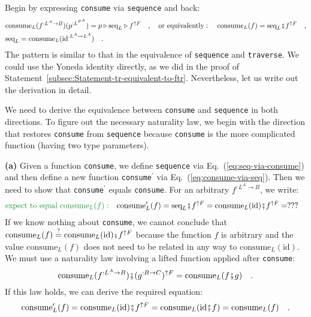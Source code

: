 Begin by expressing \lstinline!consume! via \lstinline!sequence!
and back:
\begin{align}
 & \text{consume}_{L}(f^{:L^{A}\rightarrow B})(p^{:L^{F^{A}}})=p\triangleright\text{seq}_{L}\triangleright f^{\uparrow F}\quad,\quad\text{or equivalently}:\quad\text{consume}_{L}(f)=\text{seq}_{L}\bef f^{\uparrow F}\quad,\label{eq:consume-via-seq}\\
 & \text{seq}_{L}=\text{consume}_{L}(\text{id}^{:L^{A}\rightarrow L^{A}})\quad.\label{eq:seq-via-consume}
\end{align}
The pattern is similar to that in the equivalence of \lstinline!sequence!
and \lstinline!traverse!. We could use the Yoneda identity directly,
as we did in the proof of Statement~\ref{subsec:Statement-tr-equivalent-to-ftr}.
Nevertheless, let us write out the derivation in detail.

We need to derive the equivalence between \lstinline!consume! and
\lstinline!sequence! in both directions. To figure out the necessary
naturality law, we begin with the direction that restores \lstinline!consume!
from \lstinline!sequence! because \lstinline!consume! is the more
complicated function (having two type parameters).

\textbf{(a)} Given a function \lstinline!consume!, we define \lstinline!sequence!
via Eq.~(\ref{eq:seq-via-consume}) and then define a new function
\lstinline!consume!$^{\prime}$ via Eq.~(\ref{eq:consume-via-seq}).
Then we need to show that \lstinline!consume!$^{\prime}$ equals
\lstinline!consume!. For an arbitrary $f^{:L^{A}\rightarrow B}$,
we write:
\begin{align*}
{\color{greenunder}\text{expect to equal }\text{consume}_{L}(f):}\quad & \text{consume}_{L}^{\prime}(f)=\text{seq}_{L}\bef f^{\uparrow F}=\text{consume}_{L}(\text{id})\bef f^{\uparrow F}=???
\end{align*}
If we know nothing about \lstinline!consume!, we cannot conclude
that $\text{consume}_{L}(f)\overset{?}{=}\text{consume}_{L}(\text{id})\bef f^{\uparrow F}$
because the function $f$ is arbitrary and the value $\text{consume}_{L}(f)$
does not need to be related in any way to $\text{consume}_{L}(\text{id})$.
We must use a naturality law involving a lifted function applied after
\lstinline!consume!:
\begin{equation}
\text{consume}_{L}(f^{:L^{A}\rightarrow B})\bef(g^{:B\rightarrow C})^{\uparrow F}=\text{consume}_{L}(f\bef g)\quad.\label{eq:consume-naturality-law}
\end{equation}
If this law holds, we can derive the required equation:
\[
\text{consume}_{L}^{\prime}(f)=\text{consume}_{L}(\text{id})\bef f^{\uparrow F}=\text{consume}_{L}(\text{id}\bef f)=\text{consume}_{L}(f)\quad.
\]


